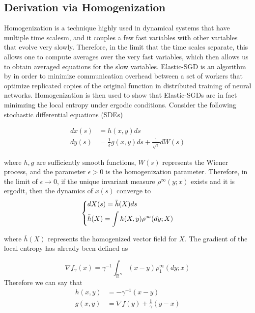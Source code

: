 \subsection{Derivation via Homogenization}
Homogenization is a technique highly used in dynamical systems that have multiple time scalesm, and it couples a few fast variables with other variables that evolve very slowly. Therefore, in the limit that the time scales separate, this allows one to compute averages over the very fast variables, which then allows us to obtain averaged equations for the slow variables. Elastic-SGD is an algorithm by \cite{elasticSGD} in order to minimize communication overhead between a set of workers that optimize replicated copies of the original function in distributed training of neural networks. Homogenization is then used to show that Elastic-SGDs are in fact minimzing the local entropy under ergodic conditions. Consider the following stochastic differential equations (SDEs)

\begin{align}
    dx(s) &= h(x,y) ds \nonumber \\
    dy(s) &= \frac{1}{\epsilon} g(x,y) ds + \frac{1}{\sqrt{\epsilon}} dW(s) \label{eq::SDEeqns}
\end{align}

where $h,g$ are sufficiently smooth functions, $W(s)$ represents the Wiener process, and the parameter $\epsilon > 0 $ is the homogenization parameter. Therefore, in the limit of $\epsilon \rightarrow 0$, if the unique invariant measure $\rho^\infty(y;x)$ exists and it is ergodit, then the dynamics of $x(s)$ converge to
\begin{equation*}
\begin{dcases}
    dX(s) = \bar{h}(X) ds \\
    \bar{h}(X) = \int h(X,y) \rho^\infty (dy; X)
\end{dcases}
\end{equation*}

where $\bar{h}(X)$ represents the homogenized vector field for $X$. The gradient of the local entropy has already been defined as

$$\nabla f_\gamma (x) = \gamma^{-1} \int_{\mathbb{R}^N} (x-y) \rho_1^\infty (dy;x)$$
Therefore we can say that
\begin{align*}
    h(x,y) &= -\gamma^{-1} (x-y) \\
    g(x,y) &= \nabla f(y) + \frac{1}{\gamma} (y-x)
\end{align*}

